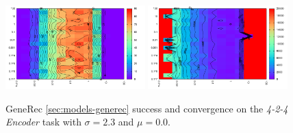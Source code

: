 \begin{figure}[H]
  \centering
  \includegraphics[width=0.48\textwidth]{img/generec-auto4-success.pdf}   
  \includegraphics[width=0.48\textwidth]{img/generec-auto4-epoch.pdf}     
  \caption{GeneRec \ref{sec:models-generec} success and convergence on the \emph{4-2-4 Encoder} task with $\sigma = 2.3$ and $\mu = 0.0$.}
  \label{fig:results-generec-auto4-performance}
\end{figure}


